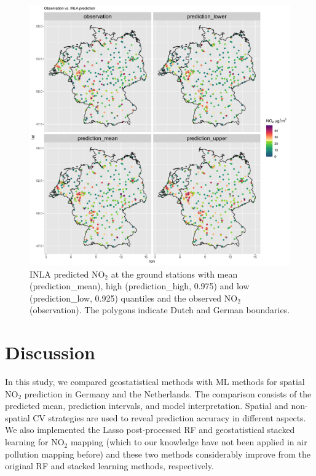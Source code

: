 \documentclass{article}
\begin{document}
\begin{figure}
\centering
\includegraphics[scale =0.1]{fig/pred_11var.png}
\caption{INLA predicted NO$_2$ at the ground stations with mean (prediction\_mean), high (prediction\_high, 0.975) and low (prediction\_low, 0.925) quantiles and the observed NO$_2$ (observation). The polygons indicate Dutch and German boundaries.}
\label{INLApred}
\end{figure}


\section{Discussion}
In this study, we compared geostatistical methods with ML methods for spatial NO$_2$ prediction in Germany and the Netherlands. The comparison consists of the predicted mean, prediction intervals, and model interpretation. Spatial and non-spatial CV strategies are used to reveal prediction accuracy in different aspects. We also implemented the Lasso post-processed RF and geostatistical stacked learning for NO$_2$ mapping (which to our knowledge have not been applied in air pollution mapping before) and these two methods considerably improve from the original RF and stacked learning methods, respectively. %
\end{document}
